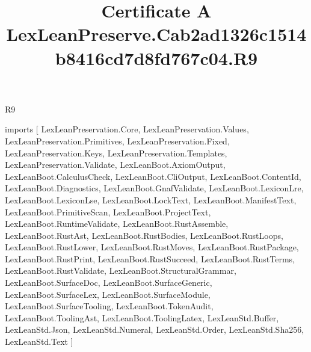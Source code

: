 \begin{lexlean}{R9}
\title{Certificate A LexLeanPreserve.Cab2ad1326c1514b8416cd7d8fd767c04.R9}
\begin{coremodule}
imports [
  LexLeanPreservation.Core,
  LexLeanPreservation.Values,
  LexLeanPreservation.Primitives,
  LexLeanPreservation.Fixed,
  LexLeanPreservation.Keys,
  LexLeanPreservation.Templates,
  LexLeanPreservation.Validate,
  LexLeanBoot.AxiomOutput,
  LexLeanBoot.CalculusCheck,
  LexLeanBoot.CliOutput,
  LexLeanBoot.ContentId,
  LexLeanBoot.Diagnostics,
  LexLeanBoot.GnafValidate,
  LexLeanBoot.LexiconLre,
  LexLeanBoot.LexiconLse,
  LexLeanBoot.LockText,
  LexLeanBoot.ManifestText,
  LexLeanBoot.PrimitiveScan,
  LexLeanBoot.ProjectText,
  LexLeanBoot.RuntimeValidate,
  LexLeanBoot.RustAssemble,
  LexLeanBoot.RustAst,
  LexLeanBoot.RustBodies,
  LexLeanBoot.RustLoops,
  LexLeanBoot.RustLower,
  LexLeanBoot.RustMoves,
  LexLeanBoot.RustPackage,
  LexLeanBoot.RustPrint,
  LexLeanBoot.RustSucceed,
  LexLeanBoot.RustTerms,
  LexLeanBoot.RustValidate,
  LexLeanBoot.StructuralGrammar,
  LexLeanBoot.SurfaceDoc,
  LexLeanBoot.SurfaceGeneric,
  LexLeanBoot.SurfaceLex,
  LexLeanBoot.SurfaceModule,
  LexLeanBoot.SurfaceTooling,
  LexLeanBoot.TokenAudit,
  LexLeanBoot.ToolingAst,
  LexLeanBoot.ToolingLatex,
  LexLeanStd.Buffer,
  LexLeanStd.Json,
  LexLeanStd.Numeral,
  LexLeanStd.Order,
  LexLeanStd.Sha256,
  LexLeanStd.Text
]


\end{coremodule}
\end{lexlean}
